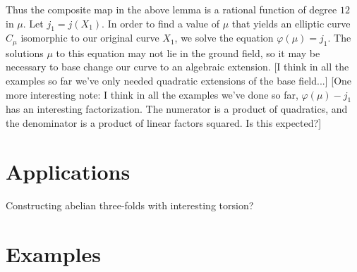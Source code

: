 \documentclass[reqno, 12pt]{amsart}
\theoremstyle{definition}
\theoremstyle{remark}
\newcommand{\sss}[1]{{\color{blue} [#1]}}
\begin{document}
Thus the composite map in the above lemma is a rational function of degree $12$ in $\mu$. Let $j_1 = j(X_1)$. In order to find a value of $\mu$ that yields an elliptic curve $C_\mu$ isomorphic to our original curve $X_1$, we solve the equation $\varphi(\mu) = j_1$. The solutions $\mu$ to this equation may not lie in the ground field, so it may be necessary to base change our curve to an algebraic extension. \sss{I think in all the examples so far we've only needed quadratic extensions of the base field...} \sss{One more interesting note: I think in all the examples we've done so far, $\varphi(\mu) - j_1$ has an interesting factorization. The numerator is a product of quadratics, and the denominator is a product of linear factors squared. Is this expected?}

\section{Applications}
Constructing abelian three-folds with interesting torsion?

\section{Examples}

%


\end{document}
